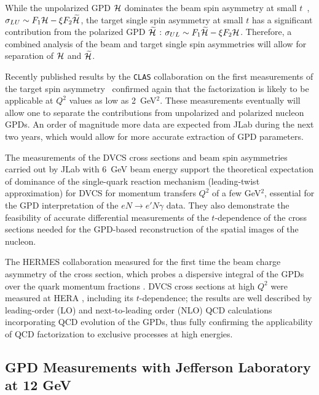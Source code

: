 While the unpolarized GPD $\cal H$ dominates the beam spin asymmetry at 
small $t$~\cite{Belitsky:2001ns}, $\sigma_{LU} \sim F_1{\cal H}-\xi F_2{\cal 
\widetilde H}$, the target single spin asymmetry at small $t$ has a 
significant contribution from the polarized GPD $\cal \widetilde H$
\cite{Belitsky:2001ns}: $\sigma_{UL} \sim F_1{\cal \widetilde H}-\xi 
F_2{\cal H}$.  Therefore, a combined analysis of the beam and target single 
spin asymmetries will allow for separation of $\cal H$ and $\cal \widetilde H$.

Recently published results by the {\tt CLAS} collaboration on the first 
measurements of the target spin asymmetry~\cite{Chen:2006na} confirmed again 
that the factorization is likely to be applicable at $Q^2$ values as low as 
2~GeV$^2$. These measurements eventually will allow one to separate the 
contributions from unpolarized and polarized nucleon GPDs.  An order of 
magnitude more data are expected from JLab during the next two years, which 
would allow for more accurate extraction of GPD parameters. 

The measurements of the DVCS cross sections and beam spin asymmetries carried 
out by JLab with 6~GeV beam energy support the theoretical expectation of 
dominance of the single-quark reaction mechanism (leading-twist approximation) 
for DVCS for momentum transfers $Q^2$ of a few GeV$^2$, essential for the GPD 
interpretation of the $eN \to e'N\gamma$ data.  They also demonstrate the 
feasibility of accurate differential measurements of the $t$-dependence of the 
cross sections needed for the GPD-based reconstruction of the spatial images 
of the nucleon.

The HERMES collaboration measured for the first time the beam charge 
asymmetry of the cross section, which probes a dispersive integral of the 
GPDs over the quark momentum fractions \cite{Airapetian:2006zr}.  DVCS 
cross sections at high $Q^2$ were measured at HERA
\cite{Chekanov:2003ya,Adloff:2001cn}, including its $t$-dependence; the 
results are well described by leading-order (LO) and next-to-leading order 
(NLO) QCD calculations incorporating QCD evolution of the GPDs, thus fully 
confirming the applicability of QCD factorization to exclusive processes 
at high energies.

\subsection{GPD Measurements with Jefferson Laboratory at 12 GeV}


